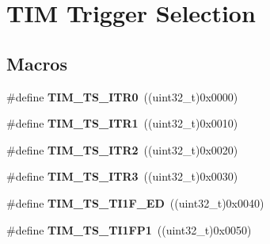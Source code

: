 \hypertarget{group___t_i_m___trigger___selection}{\section{T\-I\-M Trigger Selection}
\label{group___t_i_m___trigger___selection}
}
\subsection*{Macros}
\begin{DoxyCompactItemize}
\item 
\hypertarget{group___t_i_m___trigger___selection_gab7cf2b7db3956d4fd1e5a5d84f4891e7}{\#define {\bfseries T\-I\-M\-\_\-\-T\-S\-\_\-\-I\-T\-R0}~((uint32\-\_\-t)0x0000)}\label{group___t_i_m___trigger___selection_gab7cf2b7db3956d4fd1e5a5d84f4891e7}

\item 
\hypertarget{group___t_i_m___trigger___selection_gad90fbca297153ca9c0112a67ea2c6cb3}{\#define {\bfseries T\-I\-M\-\_\-\-T\-S\-\_\-\-I\-T\-R1}~((uint32\-\_\-t)0x0010)}\label{group___t_i_m___trigger___selection_gad90fbca297153ca9c0112a67ea2c6cb3}

\item 
\hypertarget{group___t_i_m___trigger___selection_ga8599ba58a5f911d648503c7ac55d4320}{\#define {\bfseries T\-I\-M\-\_\-\-T\-S\-\_\-\-I\-T\-R2}~((uint32\-\_\-t)0x0020)}\label{group___t_i_m___trigger___selection_ga8599ba58a5f911d648503c7ac55d4320}

\item 
\hypertarget{group___t_i_m___trigger___selection_ga63183e611b91c5847040172c0069514d}{\#define {\bfseries T\-I\-M\-\_\-\-T\-S\-\_\-\-I\-T\-R3}~((uint32\-\_\-t)0x0030)}\label{group___t_i_m___trigger___selection_ga63183e611b91c5847040172c0069514d}

\item 
\hypertarget{group___t_i_m___trigger___selection_ga8c89554efc693e679c94b5a749af123c}{\#define {\bfseries T\-I\-M\-\_\-\-T\-S\-\_\-\-T\-I1\-F\-\_\-\-E\-D}~((uint32\-\_\-t)0x0040)}\label{group___t_i_m___trigger___selection_ga8c89554efc693e679c94b5a749af123c}

\item 
\hypertarget{group___t_i_m___trigger___selection_ga38d3514d54bcdb0ea8ac8bd91c5832b5}{\#define {\bfseries T\-I\-M\-\_\-\-T\-S\-\_\-\-T\-I1\-F\-P1}~((uint32\-\_\-t)0x0050)}\label{group___t_i_m___trigger___selection_ga38d3514d54bcdb0ea8ac8bd91c5832b5}


\end{DoxyCompactItemize}
